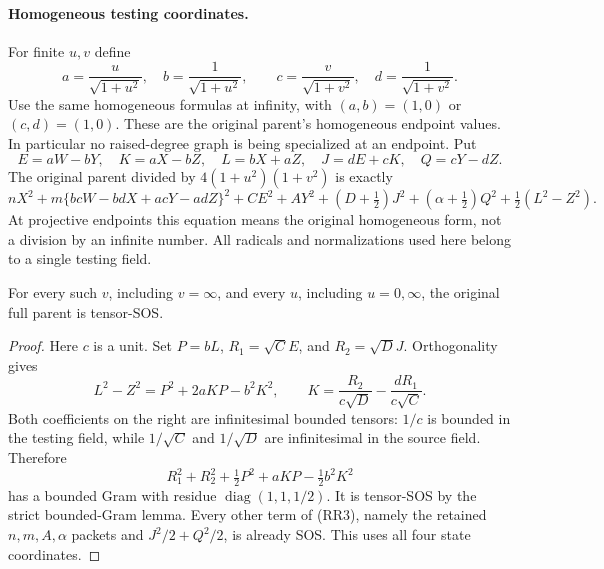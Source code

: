 \paragraph{Homogeneous testing coordinates.}
For finite $u,v$ define
\[
 a=\frac{u}{\sqrt{1+u^2}},\quad b=\frac1{\sqrt{1+u^2}},\qquad
 c=\frac{v}{\sqrt{1+v^2}},\quad d=\frac1{\sqrt{1+v^2}}.
\]
Use the same homogeneous formulas at infinity, with $(a,b)=(1,0)$
or $(c,d)=(1,0)$.  These are the original parent's homogeneous
endpoint values.  In particular no raised-degree graph is being
specialized at an endpoint.  Put
\[
 E=aW-bY,\quad K=aX-bZ,\quad L=bX+aZ,
 \quad J=dE+cK,\quad Q=cY-dZ.
\]
The original parent divided by $4(1+u^2)(1+v^2)$ is exactly
\[
 nX^2+m\{bcW-bdX+acY-adZ\}^2+CE^2+AY^2
 +(D+\tfrac12)J^2+(\alpha+\tfrac12)Q^2
 +\tfrac12(L^2-Z^2).                                    \tag{RR3}
\]
At projective endpoints this equation means the original homogeneous
form, not a division by an infinite number.  All radicals and
normalizations used here belong to a single testing field.

\begin{proposition}
For every such $v$, including $v=\infty$, and every $u$, including
$u=0,\infty$, the original full parent is tensor-SOS.
\end{proposition}
\begin{proof}
Here $c$ is a unit.  Set $P=bL$, $R_1=\sqrt C E$, and
$R_2=\sqrt D J$.  Orthogonality gives
\[
 L^2-Z^2=P^2+2aKP-b^2K^2,
 \qquad
 K=\frac{R_2}{c\sqrt D}-\frac{dR_1}{c\sqrt C}.            \tag{RR4}
\]
Both coefficients on the right are infinitesimal bounded tensors:
$1/c$ is bounded in the testing field, while $1/\sqrt C$ and
$1/\sqrt D$ are infinitesimal in the source field.  Therefore
\[
 R_1^2+R_2^2+\tfrac12P^2+aKP-\tfrac12b^2K^2
\]
has a bounded Gram with residue $\operatorname{diag}(1,1,1/2)$.
It is tensor-SOS by the strict bounded-Gram lemma.  Every other term
of (RR3), namely the retained $n,m,A,\alpha$ packets and
$J^2/2+Q^2/2$, is already SOS.  This uses all four state coordinates.
\end{proof}

